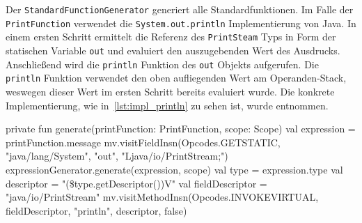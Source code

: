 Der \texttt{StandardFunctionGenerator} generiert alle Standardfunktionen. Im Falle der \texttt{PrintFunction} verwendet \toya die \texttt{System.out.println} Implementierung von Java. In einem ersten Schritt ermittelt \toya die Referenz des \texttt{PrintSteam} Typs in Form der statischen Variable \texttt{out} und evaluiert den auszugebenden Wert des Ausdrucks. Anschließend wird die \texttt{println} Funktion des \texttt{out} Objekts aufgerufen. Die \texttt{println} Funktion verwendet den oben aufliegenden Wert am Operanden-Stack, weswegen dieser Wert im ersten Schritt bereits evaluiert wurde. Die konkrete Implementierung, wie in~\autoref{lst:impl_println} zu sehen ist, wurde \textcite{enkelTutorial} entnommen.

\begin{KotlinCode}[numbers=none, caption={Bytecode zum Aufruf der \texttt{println} Funktion von Java},label=lst:impl_println]
private fun generate(printFunction: PrintFunction, scope: Scope) {
    val expression = printFunction.message
    mv.visitFieldInsn(Opcodes.GETSTATIC, "java/lang/System", "out", "Ljava/io/PrintStream;")
    expressionGenerator.generate(expression, scope)
    val type = expression.type
    val descriptor = "(\${type.getDescriptor()})V"
    val fieldDescriptor = "java/io/PrintStream"
    mv.visitMethodInsn(Opcodes.INVOKEVIRTUAL, fieldDescriptor, "println", descriptor, false)
}
\end{KotlinCode}